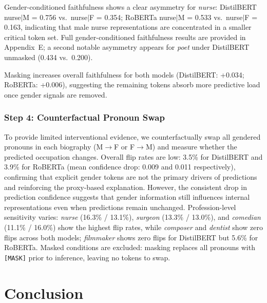 \documentclass[11pt]{article}
\begin{document}
Gender-conditioned faithfulness shows a clear asymmetry for \emph{nurse}:
DistilBERT nurse$|$M = 0.756 vs.\ nurse$|$F = 0.354; RoBERTa
nurse$|$M = 0.533 vs.\ nurse$|$F = 0.163, indicating that male nurse
representations are concentrated in a smaller critical token set.
Full gender-conditioned faithfulness results are provided in Appendix~E; a second notable asymmetry appears for
\emph{poet} under DistilBERT unmasked (0.434 vs.\ 0.200).

Masking increases overall faithfulness for both models (DistilBERT:
+0.034; RoBERTa: +0.006), suggesting the remaining tokens absorb more
predictive load once gender signals are removed.

\subsubsection*{Step 4: Counterfactual Pronoun Swap}
\label{sec:cf_swap}

To provide limited interventional evidence, we counterfactually swap all
gendered pronouns in each biography (M$\to$F or F$\to$M) and measure
whether the predicted occupation changes. Overall flip rates are low:
3.5\% for DistilBERT and 3.9\% for RoBERTa (mean confidence drop: 0.009
and 0.011 respectively), confirming that explicit gender tokens are not the primary drivers of predictions and reinforcing the proxy-based explanation.
However, the consistent drop in prediction confidence suggests that
gender information still influences internal representations even when
predictions remain unchanged.
Profession-level sensitivity varies: \emph{nurse} (16.3\% / 13.1\%),
\emph{surgeon} (13.3\% / 13.0\%), and \emph{comedian} (11.1\% / 16.0\%)
show the highest flip rates, while \emph{composer} and \emph{dentist}
show zero flips across both models; \emph{filmmaker} shows zero flips for
DistilBERT but 5.6\% for RoBERTa.
Masked conditions are excluded: masking replaces all pronouns with
\texttt{[MASK]} prior to inference, leaving no tokens to swap.

\section{Conclusion}
\end{document}
